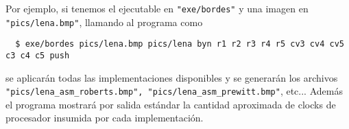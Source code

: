 Por ejemplo, si tenemos el ejecutable en \verb="exe/bordes"= y una imagen en \verb="pics/lena.bmp"=, llamando al programa como

{\small \verb=  $ exe/bordes pics/lena.bmp pics/lena byn r1 r2 r3 r4 r5 cv3 cv4 cv5 c3 c4 c5 push =}

se aplicarán todas las implementaciones disponibles y se generarán los archivos \verb="pics/lena_asm_roberts.bmp", "pics/lena_asm_prewitt.bmp"=, etc... Además el programa mostrará por salida estándar la cantidad aproximada de clocks de procesador insumida por cada implementación.

    